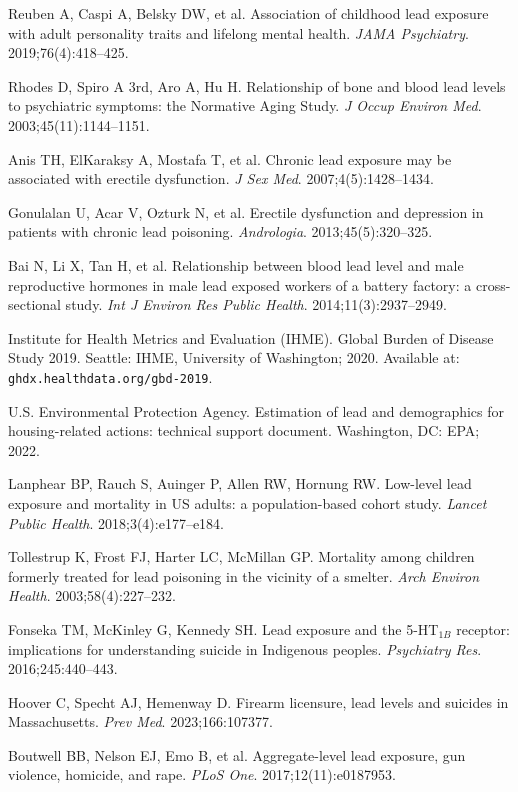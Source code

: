 \documentclass[11pt,twocolumn]{article}
\begin{document}
{\begin{enumerate}[label={[\arabic*]}, leftmargin=*, itemsep=1pt]
    \item Reuben A, Caspi A, Belsky DW, et al. Association of childhood lead exposure with adult personality traits and lifelong mental health. \textit{JAMA Psychiatry}. 2019;76(4):418--425.
    \item Rhodes D, Spiro A 3rd, Aro A, Hu H. Relationship of bone and blood lead levels to psychiatric symptoms: the Normative Aging Study. \textit{J Occup Environ Med}. 2003;45(11):1144--1151.
    \item Anis TH, ElKaraksy A, Mostafa T, et al. Chronic lead exposure may be associated with erectile dysfunction. \textit{J Sex Med}. 2007;4(5):1428--1434.
    \item Gonulalan U, Acar V, Ozturk N, et al. Erectile dysfunction and depression in patients with chronic lead poisoning. \textit{Andrologia}. 2013;45(5):320--325.
    \item Bai N, Li X, Tan H, et al. Relationship between blood lead level and male reproductive hormones in male lead exposed workers of a battery factory: a cross-sectional study. \textit{Int J Environ Res Public Health}. 2014;11(3):2937--2949.
    \item Institute for Health Metrics and Evaluation (IHME). Global Burden of Disease Study 2019. Seattle: IHME, University of Washington; 2020. Available at: \texttt{ghdx.healthdata.org/gbd-2019}.
    \item U.S. Environmental Protection Agency. Estimation of lead and demographics for housing-related actions: technical support document. Washington, DC: EPA; 2022.
    \item Lanphear BP, Rauch S, Auinger P, Allen RW, Hornung RW. Low-level lead exposure and mortality in US adults: a population-based cohort study. \textit{Lancet Public Health}. 2018;3(4):e177--e184.
    \item Tollestrup K, Frost FJ, Harter LC, McMillan GP. Mortality among children formerly treated for lead poisoning in the vicinity of a smelter. \textit{Arch Environ Health}. 2003;58(4):227--232.
    \item Fonseka TM, McKinley G, Kennedy SH. Lead exposure and the 5-HT$_{1B}$ receptor: implications for understanding suicide in Indigenous peoples. \textit{Psychiatry Res}. 2016;245:440--443.
    \item Hoover C, Specht AJ, Hemenway D. Firearm licensure, lead levels and suicides in Massachusetts. \textit{Prev Med}. 2023;166:107377.
    \item Boutwell BB, Nelson EJ, Emo B, et al. Aggregate-level lead exposure, gun violence, homicide, and rape. \textit{PLoS One}. 2017;12(11):e0187953.

\end{enumerate}}
\end{document}
